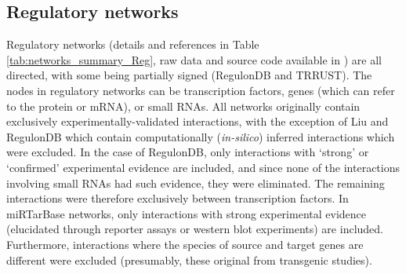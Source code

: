 

\newpage
\subsection{Regulatory networks}\label{sup_realnets_reg}
    Regulatory networks (details and references in Table \ref{tab:networks_summary_Reg}, raw data and source code available in  \cite{atiia_case-study_2017}) are all directed, with some being partially signed (RegulonDB and TRRUST). The nodes in regulatory networks can be transcription factors, genes (which can refer to the protein or mRNA), or small RNAs. All networks originally contain exclusively experimentally-validated interactions, with the exception of Liu and RegulonDB which contain computationally (\textit{in-silico}) inferred interactions which were excluded. In the case of RegulonDB, only interactions with  `strong' or `confirmed' experimental evidence are included, and since none of the interactions involving small RNAs had such evidence, they were eliminated. The remaining interactions were therefore exclusively between transcription factors. In miRTarBase networks, only interactions with strong experimental evidence (elucidated through reporter assays or western blot experiments) are included. Furthermore, interactions where the species of source and target genes are different were excluded (presumably, these original from  transgenic studies).


